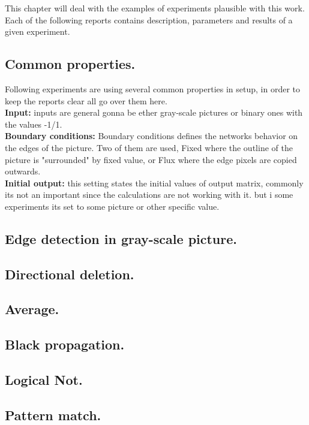 This chapter will deal with the examples of experiments plausible with this work. 
Each of the following reports contains description, parameters and results of a given experiment.
\subsection{Common properties.}
Following experiments are using several common properties in setup, in order to keep the reports clear all go over them here.\\
\textbf{Input:} inputs are general gonna be ether gray-scale pictures or binary ones with the values -1/1.\\
\textbf{Boundary conditions:} Boundary conditions defines the networks behavior on the edges of the picture. Two of them are used, Fixed where the outline of the picture is "surrounded" by fixed value, or Flux where the edge pixels are copied outwards. \\
\textbf{Initial output:} this setting states the initial values of output matrix, commonly its not an important since the calculations are not working with it. but i some experiments its set to some picture or other specific value.  \\

\newpage
\subsection{Edge detection in gray-scale picture.}


\newpage
\subsection{Directional deletion.}


\newpage
\subsection{Average.}


\newpage
\subsection{Black propagation.}


\newpage
\subsection{Logical Not.}


\newpage
\subsection{Pattern match.}


